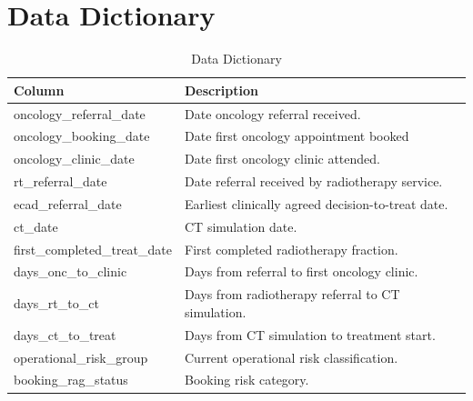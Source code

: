 \chapter{Data Dictionary}\label{appendix:datadictionary}

\begin{table}[H]
    \centering
    \begin{tabular}{|p{5cm}|p{8cm}|} 
        \hline
        \textbf{Column} & \textbf{Description} \\ 
        \hline\hline
        oncology\_referral\_date & Date oncology referral received. \\ 
        \hline
        oncology\_booking\_date & Date first oncology appointment booked \\ 
        \hline 
        oncology\_clinic\_date & Date first oncology clinic attended. \\ 
        \hline 
        rt\_referral\_date & Date referral received by radiotherapy service. \\ 
        \hline 
        ecad\_referral\_date & Earliest clinically agreed decision-to-treat date. \\ 
        \hline 
        ct\_date & CT simulation date. \\ 
        \hline 
        first\_completed\_treat\_date & First completed radiotherapy fraction. \\ 
        \hline 
        days\_onc\_to\_clinic & Days from referral to first oncology clinic. \\ 
        \hline 
        days\_rt\_to\_ct & Days from radiotherapy referral to CT simulation. \\ 
        \hline 
        days\_ct\_to\_treat & Days from CT simulation to treatment start. \\ 
        \hline 
        operational\_risk\_group & Current operational risk classification. \\ 
        \hline 
        booking\_rag\_status & Booking risk category. \\ 
        \hline 
    \end{tabular}
    \caption{Data Dictionary}
\end{table}

